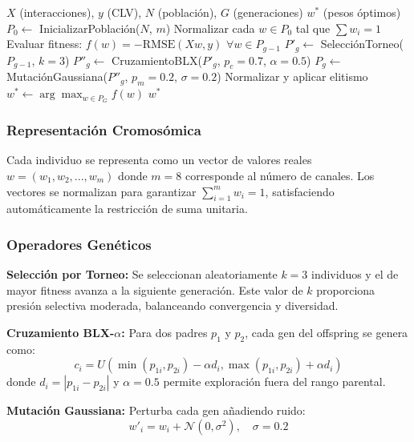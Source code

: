 \documentclass[conference]{IEEEtran}
\begin{document}
\begin{algorithm}[htbp]
\caption{OmniEvo: Optimización de Atribución}
\label{alg:ga}
\begin{algorithmic}[1]
\REQUIRE $X$ (interacciones), $y$ (CLV), $N$ (población), $G$ (generaciones)
\ENSURE $w^*$ (pesos óptimos)
\STATE $P_0 \leftarrow$ InicializarPoblación($N$, $m$)
\STATE Normalizar cada $w \in P_0$ tal que $\sum w_i = 1$
    \STATE Evaluar fitness: $f(w) = -\text{RMSE}(Xw, y)$ $\forall w \in P_{g-1}$
    \STATE $P'_g \leftarrow$ SelecciónTorneo($P_{g-1}$, $k=3$)
    \STATE $P''_g \leftarrow$ CruzamientoBLX($P'_g$, $p_c=0.7$, $\alpha=0.5$)
    \STATE $P_g \leftarrow$ MutaciónGaussiana($P''_g$, $p_m=0.2$, $\sigma=0.2$)
    \STATE Normalizar y aplicar elitismo
\ENDFOR
\STATE $w^* \leftarrow \arg\max_{w \in P_G} f(w)$
\RETURN $w^*$
\end{algorithmic}
\end{algorithm}

\subsubsection{Representación Cromosómica}
Cada individuo se representa como un vector de valores reales $w = (w_1, w_2, ..., w_m)$ donde $m = 8$ corresponde al número de canales. Los vectores se normalizan para garantizar $\sum_{i=1}^{m} w_i = 1$, satisfaciendo automáticamente la restricción de suma unitaria.

\subsubsection{Operadores Genéticos}
\textbf{Selección por Torneo:} Se seleccionan aleatoriamente $k=3$ individuos y el de mayor fitness avanza a la siguiente generación. Este valor de $k$ proporciona presión selectiva moderada, balanceando convergencia y diversidad.

\textbf{Cruzamiento BLX-$\alpha$:} Para dos padres $p_1$ y $p_2$, cada gen del offspring se genera como:
\begin{equation}
c_i = U\left(\min(p_{1i}, p_{2i}) - \alpha d_i, \max(p_{1i}, p_{2i}) + \alpha d_i\right)
\end{equation}
donde $d_i = |p_{1i} - p_{2i}|$ y $\alpha = 0.5$ permite exploración fuera del rango parental.

\textbf{Mutación Gaussiana:} Perturba cada gen añadiendo ruido:
\begin{equation}
w'_i = w_i + \mathcal{N}(0, \sigma^2), \quad \sigma = 0.2
\end{equation}
\end{document}

